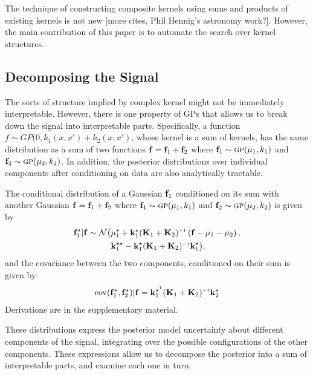 \documentclass[twoside]{article}
\begin{document}




The technique of constructing composite kernels using sums and products of existing kernels is not new \cite{rasmussen38gaussian} [more cites, Phil Hennig's astronomy work?].  However, the main contribution of this paper is to automate the search over kernel structures.


\subsection{Decomposing the Signal}

The sorts of structure implied by complex kernel might not be immediately interpretable.
However, there is one property of GPs that allows us to break down the signal into interpretable parts.
Specifically, a function $f \sim GP(0, k_1(x, x') + k_2(x,x')$, whose kernel is a sum of kernels, has the same distribution as a sum of two functions ${\bf{f}} = {\bf{f}}_1 + {\bf{f}}_2$ where ${\bf{f}}_1 \sim {\textsc{gp}}( {\bf{\mu}}_1, k_1)$ and ${\bf{f}}_2 \sim {\textsc{gp}}( {\bf{\mu}}_2, k_2)$.
In addition, the posterior distributions over individual components after conditioning on data are also analytically tractable.

The conditional distribution of a Gaussian ${\bf{f}}_1$ conditioned on its sum with another Gaussian ${\bf{f}} = {\bf{f}}_1 + {\bf{f}}_2$ where ${\bf{f}}_1 \sim {\textsc{gp}}( {\bf{\mu}}_1, k_1)$ and ${\bf{f}}_2 \sim {\textsc{gp}}( {\bf{\mu}}_2, k_2)$ is given by
\begin{align}
\vf_1^\star | \vf \sim \mathcal{N} \big( & \vmu_1^\star + \vk_1^\star (\vK_1 + \vK_2)\inv \left( \vf - \vmu_1 - \vmu_2 \right), \nonumber \\
& \vk_1^{\star\star} - \vk_1^\star (\vK_1 + \vK_2)\inv \vk_1^\star \big).
\end{align}
and the covariance between the two components, conditioned on their sum is given by:
\begin{align}
\cov(\vf_1^\star, \vf_2^\star) | \vf = \vk_1^{\star\tra} (\vK_1 + \vK_2)\inv \vk_2^\star
\end{align}
Derivations are in the supplementary material.

These distributions express the posterior model uncertainty about different components of the signal, integrating over the possible configurations of the other components.
These expressions allow us to decompose the posterior into a sum of interpretable parts, and examine each one in turn.

\end{document}
